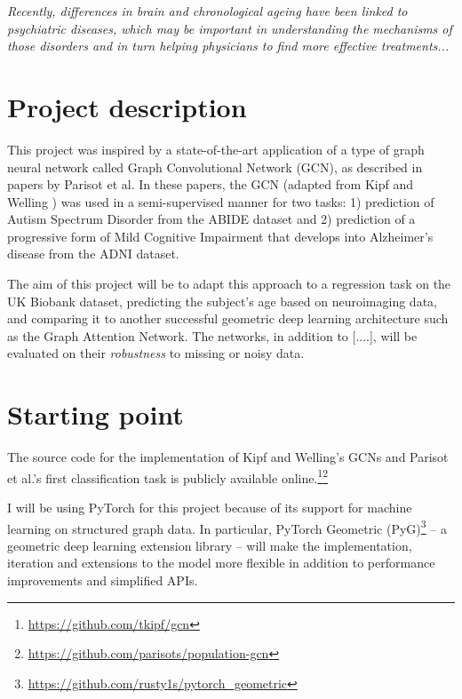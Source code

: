 \documentclass[12pt,a4paper,twoside]{article}
\begin{document}
\textit{Recently, differences in brain and chronological ageing have been linked to psychiatric diseases\cite{kaufmann2019}, which may be important in understanding the mechanisms of those disorders and in turn helping physicians to find more effective treatments...}

\section*{Project description}
This project was inspired by a state-of-the-art application of a type of graph neural network called Graph Convolutional Network (GCN), as described in papers by Parisot et al. \cite{parisot2017spectral, parisot2018disease} In these papers, the GCN (adapted from Kipf and Welling \cite{kipf2017semi}) was used in a semi-supervised manner for two tasks: 1) prediction of Autism Spectrum Disorder from the ABIDE dataset and 2) prediction of a progressive form of Mild Cognitive Impairment that develops into Alzheimer's disease from the ADNI dataset.


The aim of this project will be to adapt this approach to a regression task on the UK Biobank dataset, predicting the subject's age based on neuroimaging data, and comparing it to another successful geometric deep learning architecture such as the Graph Attention Network.\cite{velickovic2018graph} The networks, in addition to [....], will be evaluated on their \textit{robustness} to missing or noisy data.


\section*{Starting point}

The source code for the implementation of Kipf and Welling's \cite{kipf2017semi} GCNs and Parisot et al.'s \cite{parisot2018disease} first classification task is publicly available online.\footnote{\url{https://github.com/tkipf/gcn}}\footnote{\url{https://github.com/parisots/population-gcn}}

I will be using PyTorch for this project because of its support for machine learning on structured graph data. In particular, PyTorch Geometric (PyG)\footnote{\url{https://github.com/rusty1s/pytorch_geometric}} – a geometric deep learning extension library – will make the implementation, iteration and extensions to the model more flexible in addition to performance improvements and simplified APIs.
\end{document}
